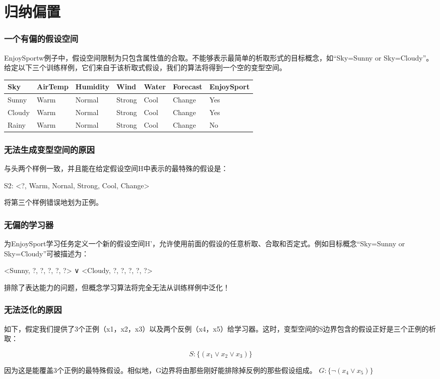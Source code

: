 \documentclass{beamer}
\begin{document}
\section{归纳偏置}
\label{sec-4}
\begin{frame}
\frametitle{一个有偏的假设空间}
\label{sec-4-1}

EnjoySportw例子中，假设空间限制为只包含属性值的合取。不能够表示最简单的析取形式的目标概念，如“Sky=Sunny or Sky=Cloudy”。
给定以下三个训练样例，它们来自于该析取式假设，我们的算法将得到一个空的变型空间。

\samll

\begin{center}
\begin{tabular}{lllllll}
 Sky     &  AirTemp  &  Humidity  &  Wind    &  Water  &  Forecast  &  EnjoySport  \\
\hline
 Sunny   &  Warm     &  Normal    &  Strong  &  Cool   &  Change    &  Yes         \\
 Cloudy  &  Warm     &  Normal    &  Strong  &  Cool   &  Change    &  Yes         \\
 Rainy   &  Warm     &  Normal    &  Strong  &  Cool   &  Change    &  No          \\
\end{tabular}
\end{center}
\end{frame}
\begin{frame}
\frametitle{无法生成变型空间的原因}
\label{sec-4-2}


与头两个样例一致，并且能在给定假设空间H中表示的最特殊的假设是：

S2: <?, Warm, Nornal, Strong, Cool, Change>

将第三个样例错误地划为正例。
\end{frame}
\begin{frame}
\frametitle{无偏的学习器}
\label{sec-4-3}

为EnjoySport学习任务定义一个新的假设空间H'，允许使用前面的假设的任意析取、合取和否定式。例如目标概念“Sky=Sunny  or Sky=Cloudy”可被描述为：

<Sunny, ?, ?, ?, ?, ?> ∨ <Cloudy, ?, ?, ?, ?, ?>

排除了表达能力的问题，但概念学习算法将完全无法从训练样例中泛化！
\end{frame}
\begin{frame}
\frametitle{无法泛化的原因}
\label{sec-4-4}

如下，假定我们提供了3个正例（x1，x2，x3）以及两个反例（x4，x5）给学习器。这时，变型空间的S边界包含的假设正好是三个正例的析取：

$$S: \{ (x_1 \lor x_2 \lor x_3) \}$$

因为这是能覆盖3个正例的最特殊假设。相似地，G边界将由那些刚好能排除掉反例的那些假设组成。
$G: \{\neg (x_4\lor x_5)\}$
\end{frame}
\end{document}
